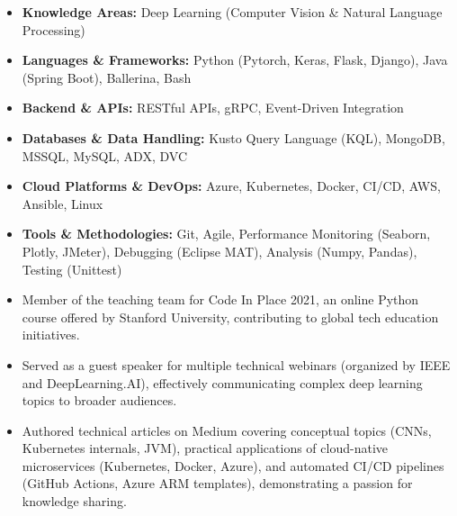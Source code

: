 \documentclass[12pt,a4paper,withhyper]{altacv}
\begin{document}
\medskip

\begin{itemize}
    \item \textbf{Knowledge Areas:} Deep Learning (Computer Vision \& Natural Language Processing)
    \item \textbf{Languages \& Frameworks:} Python (Pytorch, Keras, Flask, Django), Java (Spring Boot), Ballerina, Bash
    \item \textbf{Backend \& APIs:} RESTful APIs, gRPC, Event-Driven Integration
    \item \textbf{Databases \& Data Handling:} Kusto Query Language (KQL), MongoDB, MSSQL, MySQL, ADX, DVC
    \item \textbf{Cloud Platforms \& DevOps:} Azure, Kubernetes, Docker, CI/CD, AWS, Ansible, Linux
    \item \textbf{Tools \& Methodologies:} Git, Agile, Performance Monitoring (Seaborn, Plotly, JMeter), Debugging (Eclipse MAT), Analysis (Numpy, Pandas), Testing (Unittest)
\end{itemize}

\medskip

\begin{itemize}
    \item Member of the teaching team for Code In Place 2021, an online Python course offered by Stanford University, contributing to global tech education initiatives.
    \item Served as a guest speaker for multiple technical webinars (organized by IEEE and DeepLearning.AI), effectively communicating complex deep learning topics to broader audiences.
    \item  Authored technical articles on Medium covering conceptual topics (CNNs, Kubernetes internals, JVM), practical applications of cloud-native microservices (Kubernetes, Docker, Azure), and automated CI/CD pipelines (GitHub Actions, Azure ARM templates), demonstrating a passion for knowledge sharing.
\end{itemize}

\medskip
\end{document}
